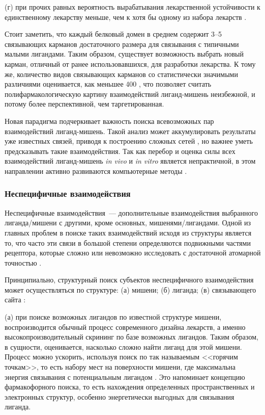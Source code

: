 \documentclass[a4paper,14pt]{article}         %
\begin{document}
(г) при прочих равных  вероятность вырабатывания лекарственной устойчивости к единственному лекарству меньше, чем к хотя бы одному из набора лекарств \cite{Anighoro2014}.

Стоит заметить, что каждый белковый домен в среднем содержит 3--5 связывающих карманов достаточного размера для связывания с типичными малыми лигандами\cite{Skolnick2015}. Таким образом, существует возможность выбрать новый карман, отличный от ранее использовавшихся, для разработки лекарства. К тому же, количество видов связывающих карманов со статистически значимыми различиями оценивается, как меньшее 400 \cite{Skolnick2015}, что позволяет считать полифармакологическую картину взаимодействий лиганд-мишень неизбежной, и потому более перспективной, чем таргетированная.

Новая парадигма подчеркивает важность поиска всевозможных пар взаимодействий лиганд-мишень. Такой анализ может аккумулировать результаты уже известных связей, приводя к построению сложных сетей \cite{Anighoro2014}, но важнее уметь предсказывать такие взаимодействия. Так как перебор и оценка силы всех взаимодействий лиганд-мишень \textit{in vivo} и \textit{in vitro} является непрактичной, в этом направлении активно развиваются компьютерные методы \cite{Chaudhari}.

\subsubsection{Неспецифичные взаимодействия}
Неспецифичные взаимодействия~--- дополнительные взаимодействия выбранного лиганда/мишени с другими, кроме основных, мишенями/лигандами. Одной из главных проблем в поиске таких взаимодействий исходя из структуры является то, что часто эти связи в большой степени определяются подвижными частями рецептора, которые сложно или невозможно исследовать с достаточной атомарной точностью \cite{Loving}.

Принципиально, структурный поиск субъектов неспецифичного взаимодействия может осуществляться по структуре: (а) мишени; (б) лиганда; (в) связывающего сайта \cite{Rognan2010}:

(а) при поиске возможных лигандов по известной структуре мишени, воспроизводится обычный процесс современного дизайна лекарств, а именно высокопроизводительный скрининг по базе возможных лигандов. Таким образом, в сущности, оценивается, насколько сложно найти лиганд для этой мишени. Процесс можно ускорить, используя поиск по так называемым <<горячим точкам>>, то есть набору мест на поверхности мишени, где максимальна энергия связывания с потенциальным лигандом \cite{Hall2015}. Это напоминает концепцию фармакофорного поиска, то есть нахождения определенных пространственных и электронных структур, особенно энергетически выгодных для связывания лиганда.
\end{document}
